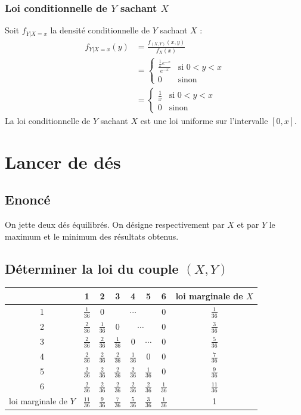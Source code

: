 \documentclass[10pt,a4paper,twoside]{article}
\begin{document}
\subsubsection{Loi conditionnelle de $Y$ sachant $X$}
Soit $f_{Y|X=x}$ la densité conditionnelle de $Y$ sachant $X$ :
\begin{align*}
f_{Y|X=x}(y) &= \frac{f_{(X,Y)}(x,y)}{f_{X}(x)}\\
&= \left\lbrace \begin{array}{ll}
\frac{\frac{1}{x}e^{-x}}{e^{-x}} & \text{si }0<y<x\\
0 & \text{sinon}
\end{array}\right.\\
&= \left\lbrace \begin{array}{ll}
\frac{1}{x} & \text{si }0<y<x\\
0 & \text{sinon}
\end{array}\right.
\end{align*}
La loi conditionnelle de $Y$ sachant $X$ est une loi uniforme sur l'intervalle $[0,x]$.

\section{Lancer de dés}
\subsection*{Enoncé}
On jette deux dés équilibrés. On désigne respectivement par $X$ et par $Y$ le maximum et le minimum des résultats obtenus.

\subsection{Déterminer la loi du couple $(X,Y)$}

\renewcommand\arraystretch{1.75}
\begin{tabular}{|c|cccccc|c|}
\hline 
 & 1 & 2 & 3 & 4 & 5 & 6 & loi marginale de $X$ \\ 
\hline 
1 & $\frac{1}{36}$ & 0 & \multicolumn{3}{c}{$\cdots$} & 0 & $\frac{1}{36}$ \\ 
2 & $\frac{2}{36}$ & $\frac{1}{36}$ & 0 & \multicolumn{2}{c}{$\cdots$} & 0 & $\frac{3}{36}$\\
3 & $\frac{2}{36}$ & $\frac{2}{36}$ & $\frac{1}{36}$ & 0 & $\cdots$ & 0 & $\frac{5}{36}$\\
4 & $\frac{2}{36}$ & $\frac{2}{36}$ & $\frac{2}{36}$ & $\frac{1}{36}$ & 0 & 0 & $\frac{7}{36}$\\
5 & $\frac{2}{36}$ & $\frac{2}{36}$ & $\frac{2}{36}$ & $\frac{2}{36}$ & $\frac{1}{36}$ & 0 & $\frac{9}{36}$\\
6 & $\frac{2}{36}$ & $\frac{2}{36}$ & $\frac{2}{36}$ & $\frac{2}{36}$ & $\frac{2}{36}$ & $\frac{1}{36}$ & $\frac{11}{36}$\\
\hline
loi marginale de $Y$ & $\frac{11}{36}$ & $\frac{9}{36}$ & $\frac{7}{36}$ & $\frac{5}{36}$ & $\frac{3}{36}$ & $\frac{1}{36}$ & 1\\
\hline
\end{tabular} 
\renewcommand\arraystretch{1}
\end{document}
